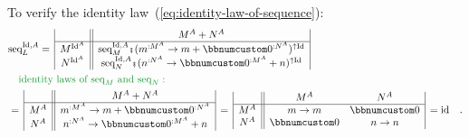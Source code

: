 To verify the identity law~(\ref{eq:identity-law-of-sequence}):
\begin{align*}
 & \text{seq}_{L}^{\text{Id},A}=\,\begin{array}{|c||c|}
 & M^{A}+N^{A}\\
\hline M^{\text{Id}^{A}} & \text{seq}_{M}^{\text{Id},A}\bef(m^{:M^{A}}\rightarrow m+\bbnum 0^{:N^{A}})^{\uparrow\text{Id}}\\
N^{\text{Id}^{A}} & \text{seq}_{N}^{\text{Id},A}\bef(n^{:N^{A}}\rightarrow\bbnum 0^{:M^{A}}+n)^{\uparrow\text{Id}}
\end{array}\\
 & \quad{\color{greenunder}\text{identity laws of }\text{seq}_{M}\text{ and }\text{seq}_{N}:}\quad\\
 & =\,\begin{array}{|c||c|}
 & M^{A}+N^{A}\\
\hline M^{A} & m^{:M^{A}}\rightarrow m+\bbnum 0^{:N^{A}}\\
N^{A} & n^{:N^{A}}\rightarrow\bbnum 0^{:M^{A}}+n
\end{array}\,=\,\begin{array}{|c||cc|}
 & M^{A} & N^{A}\\
\hline M^{A} & m\rightarrow m & \bbnum 0\\
N^{A} & \bbnum 0 & n\rightarrow n
\end{array}\,=\text{id}\quad.
\end{align*}

